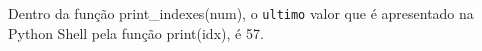 \documentclass[12pt,varwidth=16cm,border=1pt]{standalone}
\begin{document}
Dentro da função print\_indexes(num), o \verb+ultimo+ valor que é apresentado na Python Shell pela função print(idx), é 57.

\questiomtrue
\end{document}
